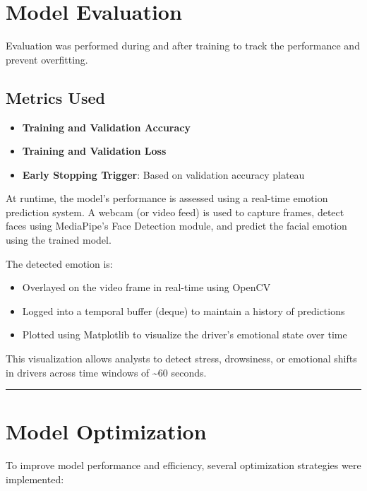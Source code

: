 \documentclass[
  letterpaper,
  DIV=11,
  numbers=noendperiod]{scrreport}
\providecommand{\tightlist}{%
  \setlength{\itemsep}{0pt}\setlength{\parskip}{0pt}}
\begin{document}
\section{Model Evaluation}\label{model-evaluation-1}

Evaluation was performed during and after training to track the
performance and prevent overfitting.

\subsection{Metrics Used}\label{metrics-used}

\begin{itemize}
\tightlist
\item
  \textbf{Training and Validation Accuracy}
\item
  \textbf{Training and Validation Loss}
\item
  \textbf{Early Stopping Trigger}: Based on validation accuracy plateau
\end{itemize}

At runtime, the model's performance is assessed using a real-time
emotion prediction system. A webcam (or video feed) is used to capture
frames, detect faces using MediaPipe's Face Detection module, and
predict the facial emotion using the trained model.

The detected emotion is:

\begin{itemize}
\tightlist
\item
  Overlayed on the video frame in real-time using OpenCV
\item
  Logged into a temporal buffer (deque) to maintain a history of
  predictions
\item
  Plotted using Matplotlib to visualize the driver's emotional state
  over time
\end{itemize}

This visualization allows analysts to detect stress, drowsiness, or
emotional shifts in drivers across time windows of \textasciitilde60
seconds.

\begin{center}\rule{0.5\linewidth}{0.5pt}\end{center}

\section{Model Optimization}\label{model-optimization-1}

To improve model performance and efficiency, several optimization
strategies were implemented:
\end{document}

